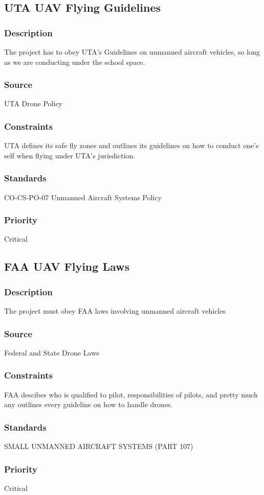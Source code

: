 \subsection{UTA UAV Flying Guidelines}
\subsubsection{Description}
The project has to obey UTA's Guidelines on unmanned aircraft vehicles, so long as we are conducting under the school space.
\subsubsection{Source}
UTA Drone Policy
\subsubsection{Constraints}
UTA defines its safe fly zones and outlines its guidelines on how to conduct one's self when flying under UTA's jurisdiction.
\subsubsection{Standards}
CO-CS-PO-07 Unmanned Aircraft Systems Policy
\subsubsection{Priority}
Critical

\subsection{FAA UAV Flying Laws}
\subsubsection{Description}
The project must obey FAA laws involving unmanned aircraft vehicles
\subsubsection{Source}
Federal and State Drone Laws
\subsubsection{Constraints}
FAA descibes who is qualified to pilot, responsibilities of pilots, and pretty much any outlines every guideline on how to handle drones.
\subsubsection{Standards}
SMALL UNMANNED AIRCRAFT SYSTEMS (PART 107)
\subsubsection{Priority}
Critical